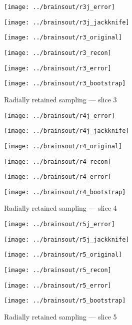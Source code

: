 \documentclass[review,supplement,onefignum,onetabnum,juq]{siamonline181217}
\begin{document}
\begin{figure}
\begin{centering}

\parbox{\imsize}{\texttt{[image: ../brainsout/r3j\_error]}}
\parbox{\imsize}{\texttt{[image: ../brainsout/r3j\_jackknife]}}

\vspace{\vertsep}

\parbox{\imsize}{\texttt{[image: ../brainsout/r3\_original]}}
\parbox{\imsize}{\texttt{[image: ../brainsout/r3\_recon]}}

\vspace{\vertsep}

\parbox{\imsize}{\texttt{[image: ../brainsout/r3\_error]}}
\parbox{\imsize}{\texttt{[image: ../brainsout/r3\_bootstrap]}}

\end{centering}
\caption{Radially retained sampling --- slice 3}
\end{figure}


\begin{figure}
\begin{centering}

\parbox{\imsize}{\texttt{[image: ../brainsout/r4j\_error]}}
\parbox{\imsize}{\texttt{[image: ../brainsout/r4j\_jackknife]}}

\vspace{\vertsep}

\parbox{\imsize}{\texttt{[image: ../brainsout/r4\_original]}}
\parbox{\imsize}{\texttt{[image: ../brainsout/r4\_recon]}}

\vspace{\vertsep}

\parbox{\imsize}{\texttt{[image: ../brainsout/r4\_error]}}
\parbox{\imsize}{\texttt{[image: ../brainsout/r4\_bootstrap]}}

\end{centering}
\caption{Radially retained sampling --- slice 4}
\end{figure}


\begin{figure}
\begin{centering}

\parbox{\imsize}{\texttt{[image: ../brainsout/r5j\_error]}}
\parbox{\imsize}{\texttt{[image: ../brainsout/r5j\_jackknife]}}

\vspace{\vertsep}

\parbox{\imsize}{\texttt{[image: ../brainsout/r5\_original]}}
\parbox{\imsize}{\texttt{[image: ../brainsout/r5\_recon]}}

\vspace{\vertsep}

\parbox{\imsize}{\texttt{[image: ../brainsout/r5\_error]}}
\parbox{\imsize}{\texttt{[image: ../brainsout/r5\_bootstrap]}}

\end{centering}
\caption{Radially retained sampling --- slice 5}
\end{figure}
\end{document}
